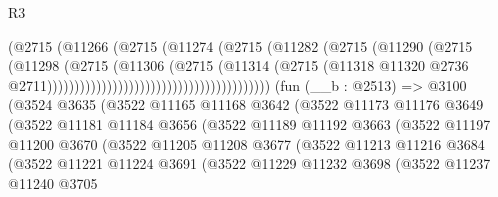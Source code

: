\begin{lexlean}{R3}
\begin{coremodule}
                                                      (@2715
                                                        (@11266
                                                          (@2715
                                                            (@11274
                                                              (@2715
                                                                (@11282
                                                                  (@2715
                                                                    (@11290
                                                                      (@2715
                                                                        (@11298
                                                                          (@2715
                                                                            (@11306
                                                                              (@2715
                                                                                (@11314
                                                                                  (@2715
                                                                                    (@11318
                                                                                      @11320
                                                                                      @2736
                                                                                      @2711)))))))))))))))))))))))))))))))))))))))))
    (fun (__b : @2513) =>
    @3100
      (@3524
        @3635
        (@3522
          @11165
          @11168
          @3642
          (@3522
            @11173
            @11176
            @3649
            (@3522
              @11181
              @11184
              @3656
              (@3522
                @11189
                @11192
                @3663
                (@3522
                  @11197
                  @11200
                  @3670
                  (@3522
                    @11205
                    @11208
                    @3677
                    (@3522
                      @11213
                      @11216
                      @3684
                      (@3522
                        @11221
                        @11224
                        @3691
                        (@3522
                          @11229
                          @11232
                          @3698
                          (@3522
                            @11237
                            @11240
                            @3705

\end{coremodule}
\end{lexlean}
